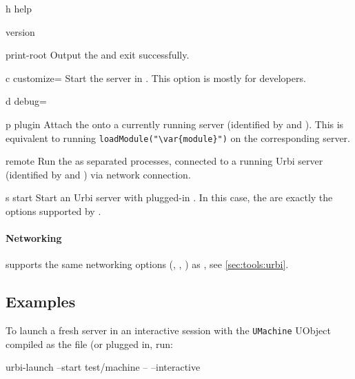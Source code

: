 \begin{options}[Options]
\item[h]{help} \optionHelp
\item{version} \optionVersion
\item{print-root} Output the  and exit successfully.
\item[c]{customize=} Start the \urbi server in
  .  This option is mostly for developers.
\item[d]{debug=} \optionDebug
\end{options}

\begin{options}
\item[p]{plugin} Attach the  onto a currently running \urbi
  server (identified by  and ).  This is equivalent to
  running \lstinline[style=varInString]|loadModule("\var{module}")| on the
  corresponding server.

\item[r]{remote} Run the  as separated processes,
  connected to a running Urbi server (identified by  and
  ) via network connection.

\item[s]{start} Start an Urbi server with plugged-in
  .  In this case, the  are exactly
  the options supported by .
\end{options}

\paragraph{Networking}
 supports the same networking options
(, , ) as
, see \autoref{sec:tools:urbi}.

\subsection{Examples}

To launch a fresh server in an interactive session with the
\lstinline|UMachine| UObject compiled as the file  (or
 plugged in, run:

\begin{shell}
urbi-launch --start test/machine -- --interactive
\end{shell}

